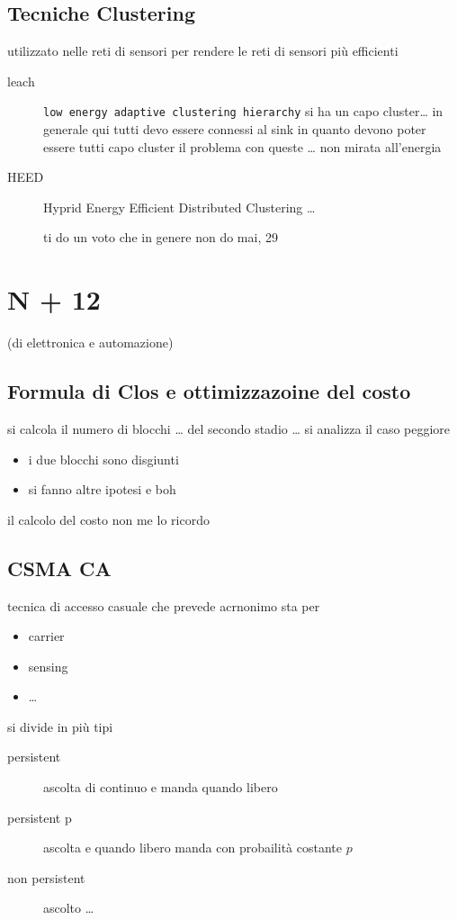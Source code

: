 \documentclass[11pt]{article}
\begin{document}
\subsection{Tecniche Clustering}
\label{sec:org0b4d519}
utilizzato nelle reti di sensori per rendere le reti di sensori più efficienti
\begin{description}
\item[{leach}] \texttt{low energy adaptive clustering hierarchy}
si ha un capo cluster\ldots{}
in generale qui tutti devo essere connessi al sink in quanto devono poter essere tutti capo cluster
il problema con queste \ldots{}
non mirata all'energia
\item[{HEED}] Hyprid Energy Efficient Distributed Clustering
\ldots{}

ti do un voto che in genere non do mai, 29
\end{description}

\section{N + 12}
\label{sec:org207f702}
(di elettronica e automazione)
\subsection{Formula di Clos e ottimizzazoine del costo}
\label{sec:org8306da7}
si calcola il numero di blocchi \ldots{} del secondo stadio
\ldots{}
si analizza il caso peggiore
\begin{itemize}
\item i due blocchi sono disgiunti
\item si fanno altre ipotesi e boh
\end{itemize}

il calcolo del costo non me lo ricordo

\subsection{CSMA CA}
\label{sec:orgf1dc247}
tecnica di accesso casuale che prevede
acrnonimo sta per
\begin{itemize}
\item carrier
\item sensing
\item \ldots{}
\end{itemize}

si divide in più tipi
\begin{description}
\item[{persistent}] ascolta di continuo e manda quando libero
\item[{persistent p}] ascolta e quando libero manda con probailità costante \(p\)
\item[{non persistent}] ascolto \ldots{}
\end{description}
\end{document}
